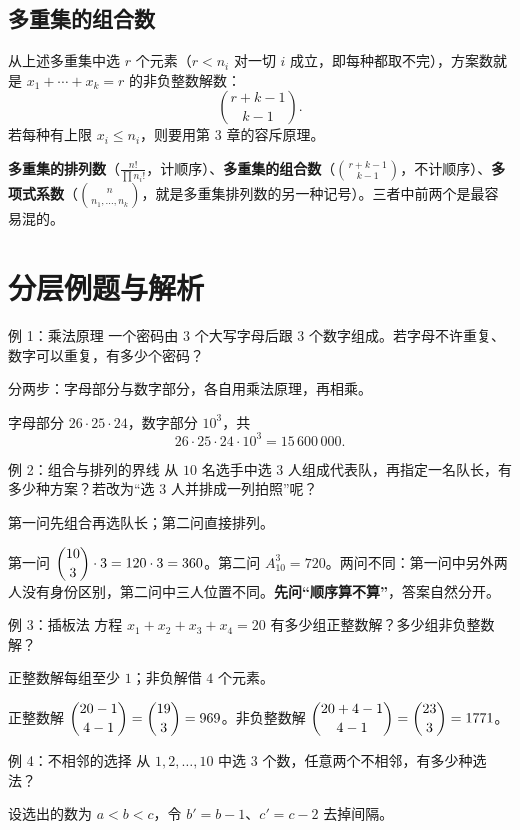 \subsection{多重集的组合数}
从上述多重集中选 $r$ 个元素（$r<n_i$ 对一切 $i$ 成立，即每种都取不完），方案数就是 $x_1+\cdots+x_k=r$ 的非负整数解数：
\[
\binom{r+k-1}{k-1}.
\]
若每种有上限 $x_i\le n_i$，则要用第 3 章的容斥原理。

\begin{tip}[三个“多重”不要混]
\textbf{多重集的排列数}（$\frac{n!}{\prod n_i!}$，计顺序）、\textbf{多重集的组合数}（$\binom{r+k-1}{k-1}$，不计顺序）、\textbf{多项式系数}（$\binom{n}{n_1,\ldots,n_k}$，就是多重集排列数的另一种记号）。三者中前两个是最容易混的。
\end{tip}

\section{分层例题与解析}
\begin{problem}{例 1：乘法原理}
一个密码由 $3$ 个大写字母后跟 $3$ 个数字组成。若字母不许重复、数字可以重复，有多少个密码？
\end{problem}
\hint 分两步：字母部分与数字部分，各自用乘法原理，再相乘。

\sol 字母部分 $26\cdot25\cdot24$，数字部分 $10^3$，共
\[
26\cdot25\cdot24\cdot10^3=15\,600\,000.
\]

\begin{problem}{例 2：组合与排列的界线}
从 $10$ 名选手中选 $3$ 人组成代表队，再指定一名队长，有多少种方案？若改为“选 $3$ 人并排成一列拍照”呢？
\end{problem}
\hint 第一问先组合再选队长；第二问直接排列。

\sol 第一问 $\dbinom{10}{3}\cdot3=120\cdot3=360$。第二问 $A_{10}^3=720$。两问不同：第一问中另外两人没有身份区别，第二问中三人位置不同。\textbf{先问“顺序算不算”}，答案自然分开。

\begin{problem}{例 3：插板法}
方程 $x_1+x_2+x_3+x_4=20$ 有多少组正整数解？多少组非负整数解？
\end{problem}
\hint 正整数解每组至少 $1$；非负解借 $4$ 个元素。

\sol 正整数解 $\dbinom{20-1}{4-1}=\dbinom{19}{3}=969$。非负整数解 $\dbinom{20+4-1}{4-1}=\dbinom{23}{3}=1771$。

\begin{problem}{例 4：不相邻的选择}
从 $1,2,\ldots,10$ 中选 $3$ 个数，任意两个不相邻，有多少种选法？
\end{problem}
\hint 设选出的数为 $a<b<c$，令 $b'=b-1$、$c'=c-2$ 去掉间隔。

